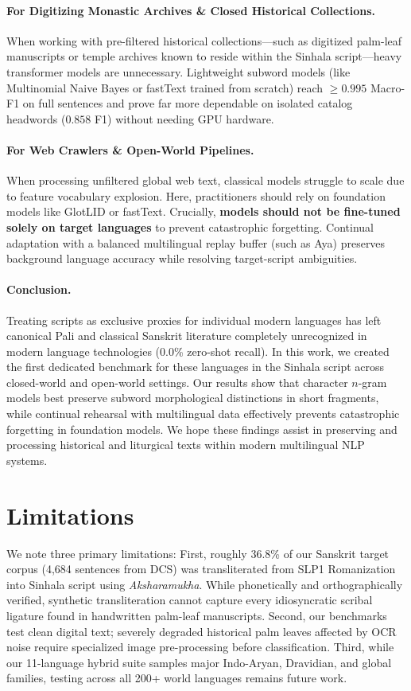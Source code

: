 \documentclass[11pt]{article}
\begin{document}
\paragraph{For Digitizing Monastic Archives \& Closed Historical Collections.}
When working with pre-filtered historical collections---such as digitized palm-leaf manuscripts or temple archives known to reside within the Sinhala script---heavy transformer models are unnecessary. Lightweight subword models (like Multinomial Naive Bayes or fastText trained from scratch) reach $\ge 0.995$ Macro-F1 on full sentences and prove far more dependable on isolated catalog headwords ($0.858$ F1) without needing GPU hardware.

\paragraph{For Web Crawlers \& Open-World Pipelines.}
When processing unfiltered global web text, classical models struggle to scale due to feature vocabulary explosion. Here, practitioners should rely on foundation models like GlotLID or fastText. Crucially, \textbf{models should not be fine-tuned solely on target languages} to prevent catastrophic forgetting. Continual adaptation with a balanced multilingual replay buffer (such as Aya) preserves background language accuracy while resolving target-script ambiguities.

\paragraph{Conclusion.}
Treating scripts as exclusive proxies for individual modern languages has left canonical Pali and classical Sanskrit literature completely unrecognized in modern language technologies (0.0\% zero-shot recall). In this work, we created the first dedicated benchmark for these languages in the Sinhala script across closed-world and open-world settings. Our results show that character $n$-gram models best preserve subword morphological distinctions in short fragments, while continual rehearsal with multilingual data effectively prevents catastrophic forgetting in foundation models. We hope these findings assist in preserving and processing historical and liturgical texts within modern multilingual NLP systems.

\section*{Limitations}
We note three primary limitations:
First, roughly 36.8\% of our Sanskrit target corpus (4,684 sentences from DCS) was transliterated from SLP1 Romanization into Sinhala script using \textit{Aksharamukha}. While phonetically and orthographically verified, synthetic transliteration cannot capture every idiosyncratic scribal ligature found in handwritten palm-leaf manuscripts.
Second, our benchmarks test clean digital text; severely degraded historical palm leaves affected by OCR noise require specialized image pre-processing before classification.
Third, while our 11-language hybrid suite samples major Indo-Aryan, Dravidian, and global families, testing across all 200+ world languages remains future work.
\end{document}
